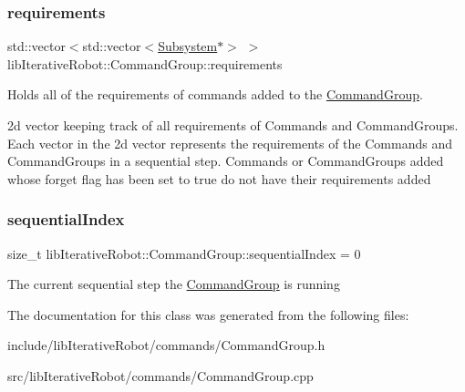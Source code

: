 \subsubsection{\texorpdfstring{requirements}{requirements}}
{\footnotesize\ttfamily std\+::vector$<$std\+::vector$<$\mbox{\hyperlink{classlib_iterative_robot_1_1_subsystem}{Subsystem}}$\ast$$>$ $>$ lib\+Iterative\+Robot\+::\+Command\+Group\+::requirements\hspace{0.3cm}{\ttfamily [private]}}



Holds all of the requirements of commands added to the \mbox{\hyperlink{classlib_iterative_robot_1_1_command_group}{Command\+Group}}. 

2d vector keeping track of all requirements of Commands and Command\+Groups. Each vector in the 2d vector represents the requirements of the Commands and Command\+Groups in a sequential step. Commands or Command\+Groups added whose forget flag has been set to true do not have their requirements added \mbox{\label{classlib_iterative_robot_1_1_command_group_ae6ba0e30e4caa58f4b019ab496487ab7}} 
\subsubsection{\texorpdfstring{sequentialIndex}{sequentialIndex}}
{\footnotesize\ttfamily size\+\_\+t lib\+Iterative\+Robot\+::\+Command\+Group\+::sequential\+Index = 0\hspace{0.3cm}{\ttfamily [private]}}

The current sequential step the \mbox{\hyperlink{classlib_iterative_robot_1_1_command_group}{Command\+Group}} is running 

The documentation for this class was generated from the following files\+:\begin{DoxyCompactItemize}
\item 
include/lib\+Iterative\+Robot/commands/Command\+Group.\+h\item 
src/lib\+Iterative\+Robot/commands/Command\+Group.\+cpp\end{DoxyCompactItemize}
